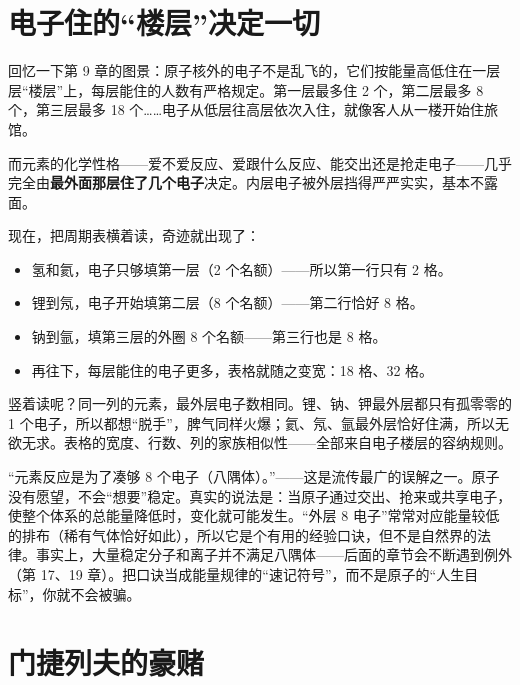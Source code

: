 \section{电子住的“楼层”决定一切}

回忆一下第 9 章的图景：原子核外的电子不是乱飞的，它们按能量高低住在一层层“楼层”上，每层能住的人数有严格规定。第一层最多住 2 个，第二层最多 8 个，第三层最多 18 个……电子从低层往高层依次入住，就像客人从一楼开始住旅馆。

而元素的化学性格——爱不爱反应、爱跟什么反应、能交出还是抢走电子——几乎完全由\textbf{最外面那层住了几个电子}决定。内层电子被外层挡得严严实实，基本不露面。

现在，把周期表横着读，奇迹就出现了：

\begin{itemize}[itemsep=2pt]
\item 氢和氦，电子只够填第一层（2 个名额）——所以第一行只有 2 格。
\item 锂到氖，电子开始填第二层（8 个名额）——第二行恰好 8 格。
\item 钠到氩，填第三层的外圈 8 个名额——第三行也是 8 格。
\item 再往下，每层能住的电子更多，表格就随之变宽：18 格、32 格。
\end{itemize}

竖着读呢？同一列的元素，最外层电子数相同。锂、钠、钾最外层都只有孤零零的 1 个电子，所以都想“脱手”，脾气同样火爆；氦、氖、氩最外层恰好住满，所以无欲无求。表格的宽度、行数、列的家族相似性——全部来自电子楼层的容纳规则。

\begin{wuqu}
“元素反应是为了凑够 8 个电子（八隅体）。”——这是流传最广的误解之一。原子没有愿望，不会“想要”稳定。真实的说法是：当原子通过交出、抢来或共享电子，使整个体系的总能量降低时，变化就可能发生。“外层 8 电子”常常对应能量较低的排布（稀有气体恰好如此），所以它是个有用的经验口诀，但不是自然界的法律。事实上，大量稳定分子和离子并不满足八隅体——后面的章节会不断遇到例外（第 17、19 章）。把口诀当成能量规律的“速记符号”，而不是原子的“人生目标”，你就不会被骗。
\end{wuqu}

\section{门捷列夫的豪赌}

